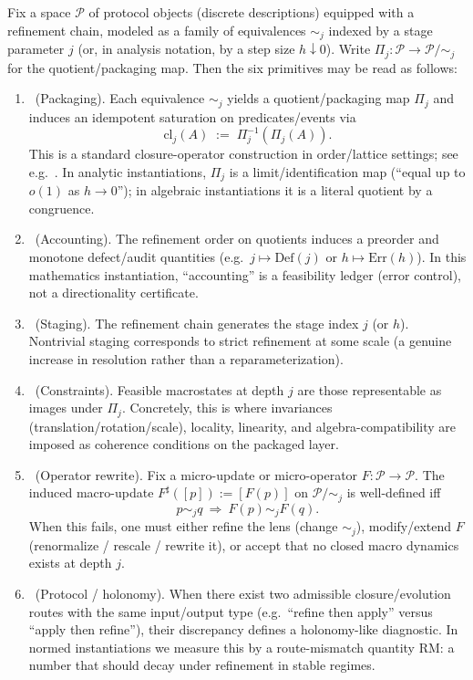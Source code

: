 \begin{remark}\label{rem:six-primitives}
Fix a space $\mathcal P$ of protocol objects (discrete descriptions) equipped with a refinement chain, modeled as a family of equivalences $\sim_j$ indexed by a stage parameter $j$ (or, in analysis notation, by a step size $h\downarrow 0$).
Write $\Pi_j:\mathcal P\to \mathcal P/\!\sim_j$ for the quotient/packaging map.
Then the six primitives may be read as follows:
\begin{enumerate}
  \item \Pfive\ (Packaging). Each equivalence $\sim_j$ yields a quotient/packaging map $\Pi_j$ and induces an idempotent saturation on predicates/events via
  \[
    \mathrm{cl}_j(A)\;:=\;\Pi_j^{-1}(\Pi_j(A)).
  \]
  This is a standard closure-operator construction in order/lattice settings; see e.g.\ \cite{DaveyPriestley2002}.
  In analytic instantiations, $\Pi_j$ is a limit/identification map (``equal up to $o(1)$ as $h\to 0$''); in algebraic instantiations it is a literal quotient by a congruence.

  \item \Psix\ (Accounting). The refinement order on quotients induces a preorder and monotone defect/audit quantities (e.g.\ $j\mapsto \mathrm{Def}(j)$ or $h\mapsto \mathrm{Err}(h)$).
  In this mathematics instantiation, ``accounting'' is a feasibility ledger (error control), not a directionality certificate.

  \item \Pfour\ (Staging). The refinement chain generates the stage index $j$ (or $h$).
  Nontrivial staging corresponds to strict refinement at some scale (a genuine increase in resolution rather than a reparameterization).

  \item \Ptwo\ (Constraints). Feasible macrostates at depth $j$ are those representable as images under $\Pi_j$.
  Concretely, this is where invariances (translation/rotation/scale), locality, linearity, and algebra-compatibility are imposed as coherence conditions on the packaged layer.

  \item \Pone\ (Operator rewrite). Fix a micro-update or micro-operator $F:\mathcal P\to\mathcal P$.
  The induced macro-update $F^\sharp([p]) := [F(p)]$ on $\mathcal P/\!\sim_j$ is well-defined iff
  \[
    p\sim_j q \ \Rightarrow\ F(p)\sim_j F(q).
  \]
  When this fails, one must either refine the lens (change $\sim_j$), modify/extend $F$ (renormalize / rescale / rewrite it), or accept that no closed macro dynamics exists at depth $j$.

  \item \Pthree\ (Protocol / holonomy). When there exist two admissible closure/evolution routes with the same input/output type (e.g.\ ``refine then apply'' versus ``apply then refine''), their discrepancy defines a holonomy-like diagnostic.
  In normed instantiations we measure this by a route-mismatch quantity $\mathrm{RM}$: a number that should decay under refinement in stable regimes.
\end{enumerate}
\end{remark}

